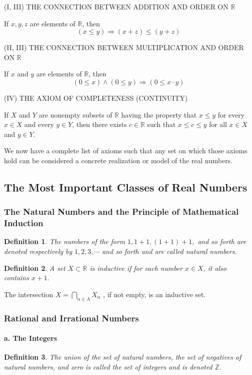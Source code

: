 \documentclass[a4paper,12pt]{article} %
\newtheorem{definition}{Definition}[section]
\begin{document}
\begin{center}
    (I, III) THE CONNECTION BETWEEN ADDITION AND ORDER ON $\mathbb{R}$
\end{center}
If $x,y,z$ are elements of $\mathbb{R}$, then 
\[(x\le y) \Rightarrow (x+z) \le (y+z)\]

\begin{center}
    (II, III) THE CONNECTION BETWEEN MULTIPLICATION AND 
    ORDER ON $\mathbb{R}$
\end{center}
If $x$ and $y$ are elements of $\mathbb{R}$, then
\[(0\le x)\wedge(0\le y) \Rightarrow (0\le x\cdot y)\]

\begin{center}
    (IV) THE AXIOM OF COMPLETENESS (CONTINUITY)
\end{center}
If $X$ and $Y$ are nonempty subsets of $\mathbb{R}$ having 
the property that $x\le y$ for every $x\in X$ and every $y\in Y$,
then there exists $c\in\mathbb{R}$ such that $x\le c \le y$  for 
all $x\in X$ and $y\in Y$.

We now have a complete list of axioms such that any set on 
which those axioms hold can be considered a concrete 
realization or model of the real numbers.

\subsection{The Most Important Classes of Real Numbers}
\subsubsection{The Natural Numbers and the Principle of Mathematical 
Induction}
\begin{definition} 
    The numbers of the form $1,1+1,(1+1)+1,$ and so forth are denoted 
    respectively by $1,2,3,\cdots$ and so forth and are called natural
    numbers.
\end{definition}
\begin{definition}
    A set $X\subset\mathbb{R}$ is inductive if for each number $x\in X$, 
    it also contains $x+1$.
\end{definition}
The intersection $\displaystyle X=\bigcap_{\alpha \in A} X_{\alpha}$
, if not empty, is an inductive set. 

\subsubsection{Rational and Irrational Numbers}
\paragraph{a. The Integers}
\begin{definition}
    The union of the set of natural numbers, the set of negatives of 
    natural numbers, and zero is called the set of \textit{integers}
    and is denoted $\mathbb{Z}$.
\end{definition}
\end{document}
